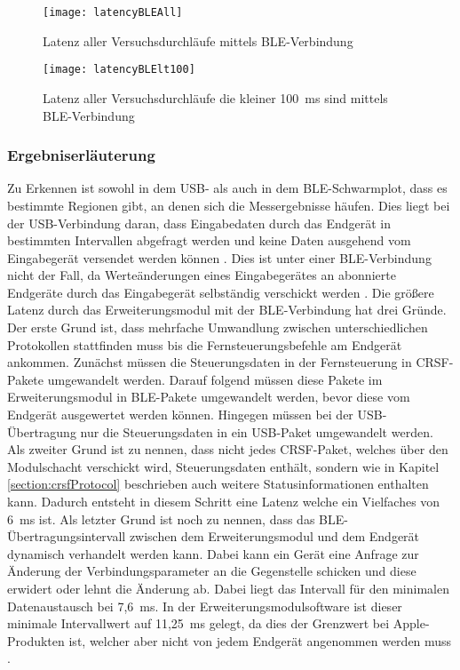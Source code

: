 \begin{figure}[H]
    \centering
    \texttt{[image: latencyBLEAll]}
    \caption{Latenz aller Versuchsdurchläufe mittels \ac{BLE}-Verbindung}
    \label{fig:latencyBLEAll}
\end{figure}

\begin{figure}[H]
    \centering
    \texttt{[image: latencyBLElt100]}
    \caption{Latenz aller Versuchsdurchläufe die kleiner 100~ms sind mittels \ac{BLE}-Verbindung}
    \label{fig:latencyBLElt100}
\end{figure}

\subsubsection{Ergebniserläuterung}
\label{section:resultExplanation}
Zu Erkennen ist sowohl in dem USB- als auch in dem \ac{BLE}-Schwarmplot, dass es bestimmte Regionen gibt, an denen sich die Messergebnisse häufen. Dies liegt bei der USB-Verbindung daran, dass Eingabedaten durch das Endgerät in bestimmten Intervallen abgefragt werden und keine Daten ausgehend vom Eingabegerät versendet werden können \cites[S.~48f., S.~277ff.]{usb2Spec}[S.~5]{wimmerLatenzStation}. Dies ist unter einer \ac{BLE}-Verbindung nicht der Fall, da Werteänderungen eines Eingabegerätes an abonnierte Endgeräte durch das Eingabegerät selbständig verschickt werden \cite[S.~1516]{bluetoothCore}. Die größere Latenz durch das Erweiterungsmodul mit der \ac{BLE}-Verbindung hat drei Gründe. Der erste Grund ist, dass mehrfache Umwandlung zwischen unterschiedlichen Protokollen stattfinden muss bis die Fernsteuerungsbefehle am Endgerät ankommen. Zunächst müssen die Steuerungsdaten in der Fernsteuerung in CRSF-Pakete umgewandelt werden. Darauf folgend müssen diese Pakete im Erweiterungsmodul in BLE-Pakete umgewandelt werden, bevor diese vom Endgerät ausgewertet werden können. Hingegen müssen bei der USB-Übertragung nur die Steuerungsdaten in ein USB-Paket umgewandelt werden. Als zweiter Grund ist zu nennen, dass nicht jedes CRSF-Paket, welches über den Modulschacht verschickt wird, Steuerungsdaten enthält, sondern wie in Kapitel \ref{section:crsfProtocol} beschrieben auch weitere Statusinformationen enthalten kann. Dadurch entsteht in diesem Schritt eine Latenz welche ein Vielfaches von 6~ms ist. Als letzter Grund ist noch zu nennen, dass das \ac{BLE}-Übertragungsintervall zwischen dem Erweiterungsmodul und dem Endgerät dynamisch verhandelt werden kann. Dabei kann ein Gerät eine Anfrage zur Änderung der Verbindungsparameter an die Gegenstelle schicken und diese erwidert oder lehnt die Änderung ab. Dabei liegt das Intervall für den minimalen Datenaustausch bei 7,6~ms. In der Erweiterungsmodulsoftware ist dieser minimale Intervallwert auf 11,25~ms gelegt, da dies der Grenzwert bei Apple-Produkten ist, welcher aber nicht von jedem Endgerät angenommen werden muss \cite[S.~188]{appleDesignGuide}. \cite{bleConnectionParameter}

